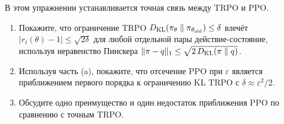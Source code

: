 \begin{exercise}
\label{ex:trpo-ppo-connection}
В этом упражнении устанавливается точная связь между TRPO и PPO.
\begin{enumerate}[label=(\alph*)]
  \item Покажите, что ограничение TRPO $D_{\mathrm{KL}}\!\left(\pi_\theta\;\|\;\pi_{\theta_\mathrm{old}}\right) \leq \delta$ влечёт $|r_t(\theta) - 1| \leq \sqrt{2\delta}$ для любой отдельной пары действие-состояние, используя неравенство Пинскера $\|\pi - q\|_1 \leq \sqrt{2\,D_{\mathrm{KL}}\!\left(\pi\;\|\;q\right)}$.
  \item Используя часть (a), покажите, что отсечение PPO при $\varepsilon$ является приближением первого порядка к ограничению KL TRPO с $\delta \approx \varepsilon^2/2$.
  \item Обсудите одно преимущество и один недостаток приближения PPO по сравнению с точным TRPO.
\end{enumerate}
\end{exercise}

